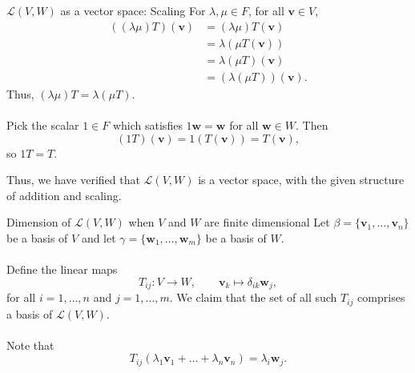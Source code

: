 \documentclass{beamer}
\def\v{\bm{v}}
\def\w{\bm{w}}
\def\L{\mathcal{L}}
\begin{document}
        \begin{frame}{$\L(V, W)$ as a vector space: Scaling}
                For $\lambda, \mu \in F$, for all $\v \in V$,
                \begin{align*}
                        ((\lambda \mu)T)(\v) &= (\lambda \mu) T(\v) \\
                                &= \lambda (\mu T(\v)) \\
                                &= \lambda (\mu T)(\v) \\
                                &= (\lambda (\mu T))(\v).
                \end{align*}
                Thus, $(\lambda \mu) T = \lambda (\mu T)$. \\~\\
                
                Pick the scalar $1 \in F$ which satisfies $1\w = \w$ for all $\w \in W$. Then
                \[
                        (1T)(\v) = 1(T(\v)) = T(\v),
                \]
                so $1T = T$.
        \end{frame}

        \begin{frame}
                Thus, we have verified that $\L(V, W)$ is a vector space, with the given structure of addition and scaling.
        \end{frame}

        \begin{frame}{Dimension of $\L(V, W)$ when $V$ and $W$ are finite dimensional}
                Let $\beta = \{\v_1, \dots, \v_n\}$ be a basis of $V$ and let $\gamma = \{\w_1, \dots, \w_m\}$ be a basis of $W$. \\~\\

                Define the linear maps
                \[
                        T_{ij}\colon V \to W, \qquad \v_k \mapsto \delta_{ik}\w_j,
                \]
                for all $i = 1, \dots, n$ and $j = 1, \dots, m$. We claim that the set of all such $T_{ij}$ comprises a basis of $\L(V, W)$. \\~\\
                \pause
                Note that 
                \[
                        T_{ij}(\lambda_1\v_1 + \dots + \lambda_n\v_n) = \lambda_i\w_j.
                \]
        \end{frame}
\end{document}
